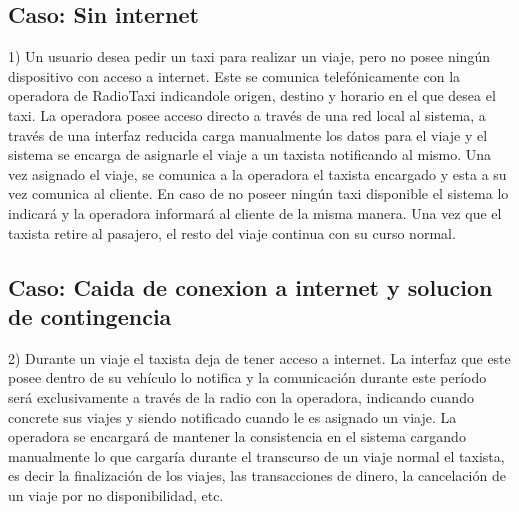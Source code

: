 \subsection{Caso: Sin internet}
1) Un usuario desea pedir un taxi para realizar un viaje, pero no posee ningún dispositivo con acceso a internet. Este se comunica telefónicamente con la operadora de RadioTaxi indicandole origen, destino y horario en el que desea el taxi. La operadora posee acceso directo a través de una red local al sistema, a través de una interfaz reducida carga manualmente los datos para el viaje y el sistema se encarga de asignarle el viaje a un taxista notificando al mismo. Una vez asignado el viaje, se comunica a la operadora el taxista encargado y esta a su vez comunica al cliente. En caso de no poseer ningún taxi disponible el sistema lo indicará y la operadora informará al cliente de la misma manera. Una vez que el taxista retire al pasajero, el resto del viaje continua con su curso normal.

\subsection{Caso: Caida de conexion a internet y solucion de contingencia}
2) Durante un viaje el taxista deja de tener acceso a internet. La interfaz que este posee dentro de su veh\'iculo lo notifica y la comunicación durante este per\'iodo será exclusivamente a través de la radio con la operadora, indicando cuando concrete sus viajes y siendo notificado cuando le es asignado un viaje. La operadora se encargará de mantener la consistencia en el sistema cargando manualmente lo que cargar\'ia durante el transcurso de un viaje normal el taxista, es decir la finalización de los viajes, las transacciones de dinero, la cancelación de un viaje por no disponibilidad, etc.

